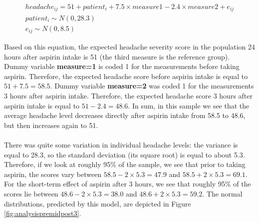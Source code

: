 \documentclass[]{report}\usepackage[]{graphicx}\usepackage[]{color}
\begin{document}
\begin{eqnarray}
headache_{ij} = 51 + patient_i +7.5 \times measure1 - 2.4 \times measure2 + e_{ij} \nonumber\\
patient_i \sim N(0, 28.3)\nonumber\\
e_{ij} \sim N(0, 8.5)\nonumber
\end{eqnarray}

Based on this equation, the expected headache severity score in the population 24 hours after aspirin intake is 51 (the third measure is the reference group). Dummy variable \textbf{measure=1} is coded 1 for the measurements before taking aspirin. Therefore, the expected headache score before aspirin intake is equal to $51+7.5 = 58.5$. Dummy variable \textbf{measure=2} was coded 1 for the measurements 3 hours after aspirin intake. Therefore, the expected headache score 3 hours after aspirin intake is equal to $51 - 2.4 = 48.6$. In sum, in this sample we see that the average headache level decreases directly after aspirin intake from 58.5 to 48.6, but then increases again to 51. 
\\
\\
There was quite some variation in individual headache levels: the variance is equal to 28.3, so the standard deviation (its square root) is equal to about 5.3. Therefore, if we look at roughly 95\% of the sample, we see that prior to taking aspirin, the scores vary between $58.5 -2\times 5.3 = 47.9$ and $58.5 + 2 \times 5.3 = 69.1$. For the short-term effect of aspirin after 3 hours, we see that roughly 95\% of the scores lie between $48.6 -2\times 5.3 = 38.0$ and $48.6 + 2 \times 5.3 = 59.2$. The normal distributions, predicted by this model, are depicted in Figure \ref{fig:analysispremidpost3}.
\end{document}

